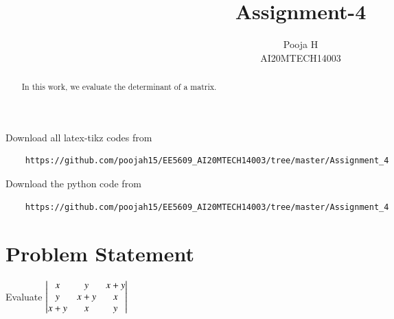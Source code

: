 \documentclass[journal,12pt,twocolumn]{IEEEtran}
\begin{document}
	\makeatother
	\let\StandardTheFigure\thefigure
	\let\vec\mathbf
	\renewcommand{\thefigure}{\theproblem}
	\def\putbox#1#2#3{\makebox[0in][l]{\makebox[#1][l]{}\raisebox{\baselineskip}[0in][0in]{\raisebox{#2}[0in][0in]{#3}}}}
	\def\rightbox#1{\makebox[0in][r]{#1}}
	\def\centbox#1{\makebox[0in]{#1}}
	\def\topbox#1{\raisebox{-\baselineskip}[0in][0in]{#1}}
	\def\midbox#1{\raisebox{-0.5\baselineskip}[0in][0in]{#1}}
	\vspace{3cm}
	\title{Assignment-4}
	\author{Pooja H \\ AI20MTECH14003}
	\maketitle
	\newpage
	\bigskip
	\renewcommand{\thefigure}{\theenumi}
	\renewcommand{\thetable}{\theenumi}
	\begin{abstract}
		In this work, we evaluate the determinant of a matrix.
	\end{abstract}
	Download all latex-tikz codes from 
	\begin{lstlisting}
	https://github.com/poojah15/EE5609_AI20MTECH14003/tree/master/Assignment_4
	\end{lstlisting}
   Download the python code from
\begin{lstlisting}
	https://github.com/poojah15/EE5609_AI20MTECH14003/tree/master/Assignment_4
\end{lstlisting}
	\section{Problem Statement}
    Evaluate $\begin{vmatrix}x & y & x+y\\ y & x+y & x\\ x+y & x &y\end{vmatrix}$
	
\end{document}
